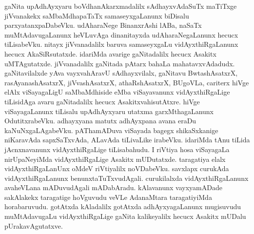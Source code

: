 gaNita upAdhAyxyaru boVdhanAkarxmadalilx sAdhayxvAdaSuTx maTiTxge jiVvanakekx saMbaMdhapaTaTx samaseyxgaLanunx biDisalu parxyatanxpaDabeVku. udAharaNege BinanxrAshi lABa, naSaTx muMtAdavugaLanunx heVLuvAga dinanitayxda udAharaNegaLanunx hecucx tiLisabeVku. nitayx jiVvanadalilx baruva samaseyxgaLu vidAyxthiRgaLanunx hecucx AkaSiRsutatxde. idariMda avarige gaNitadalilx hecucx Asakitx uMTAgutatxde. jiVvanadalilx gaNitada pAtarx bahaLa mahatavxvAdadudx. gaNitavilalxde yAva vayxvahAravU sAdhayxvilalx, gaNitavu BwtashAsatxrX, rasAyanashAsatxrX, jiVvashAsatxrX, athaRshAsatxrX, BUgoVLa, cariterx hiVge elAlx viSayagaLigU saMbaMdhiside eMba viSayavanunx vidAyxthiRgaLige tiLisidAga avaru gaNitadalilx hecucx AsakitxvahisutAtxre. hiVge viSayagaLanunx tiLisalu upAdhAyxyaru utatxma garxMthagaLanunx OdutitxrabeVku. adhayxyana matutx adhAyxpana avana eraDu kaNuNxgaLAgabeVku. pAThamADuva viSayada bagegx shikaSxkanige niKaravAda sapxSaTxvAda, ALavAda tiLivaLike irabeVku. idariMda tAnu tiLida jAcnxnavanunx vidAyxthiRgaLige tiLisabahudu. I riVtiya hosa viSayagaLa nirUpaNeyiMda vidAyxthiRgaLige Asakitx mUDutatxde. taragatiya elalx vidAyxthiRgaLanUnx oMdeV riVtiyalilx noVDabeVku. savxlapx curukAda vidAyxthiRgaLanunx benunxtaTuTxvudAgali. curukilalxda vidAyxthiRgaLanunx avaheVLana mADuvudAgali mADabAradu. kAlavanunx vayxyamADade sakAlakekx taragatige hoVguvudu veVLe AdanaMtara taragatiyiMda horabaruvudu. gotAtxda kAladalilx gotAtxda adhAyxyagaLanunx mugisuvudu muMtAdavugaLu vidAyxthiRgaLige gaNita kalikeyalilx hecucx Asakitx mUDalu pUrakavAgutatxve.

